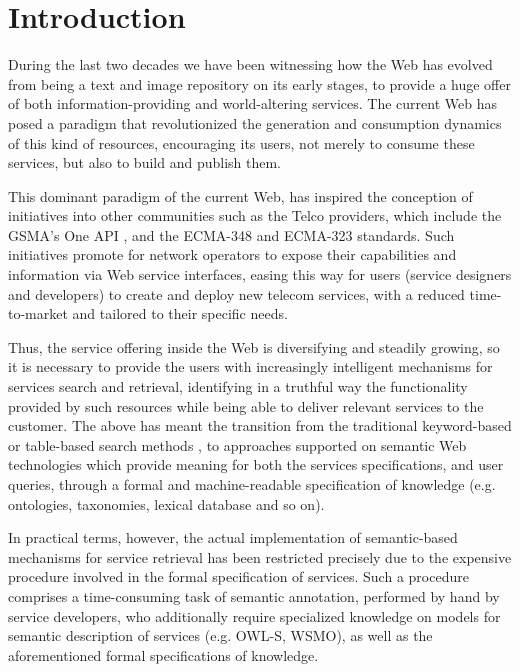 \section{Introduction}
\label{sec:introduction}

\noindent During the last two decades we have been witnessing how the Web has evolved from being a text and image repository on its early stages, to provide a huge offer of both information-providing and world-altering services. The current Web has posed a paradigm that revolutionized the generation and consumption dynamics of this kind of resources, encouraging its users, not merely to consume these services, but also to build and publish them.

This dominant paradigm of the current Web, has inspired the conception of initiatives into other communities such as the Telco providers, which include the GSMA’s One API \cite{GSMA:2013}, and the ECMA-348 \cite{ECMA:2012} and ECMA-323 \cite{ECMA:2011} standards. Such initiatives promote for network operators to expose their capabilities and information via Web service interfaces, easing this way for users (service designers and developers) to create and deploy new telecom services, with a reduced time-to-market and tailored to their specific needs.

Thus, the service offering inside the Web is diversifying and steadily growing, so it is necessary to provide the users with increasingly intelligent mechanisms for services search and retrieval, identifying in a truthful way the functionality provided by such resources while being able to deliver relevant services to the customer. The above has meant the transition from the traditional keyword-based or table-based search methods \cite{Bernstein:2002}, to approaches supported on semantic Web technologies which provide meaning for both the services specifications, and user queries, through a formal and machine-readable specification of knowledge (e.g. ontologies, taxonomies, lexical database and so on).

In practical terms, however, the actual implementation of semantic-based mechanisms for service retrieval has been restricted precisely due to the expensive procedure involved in the formal specification of services. Such a procedure comprises a time-consuming task of semantic annotation, performed by hand by service developers, who additionally require specialized knowledge on models for semantic description of services (e.g. OWL-S, WSMO), as well as the aforementioned formal specifications of knowledge.


